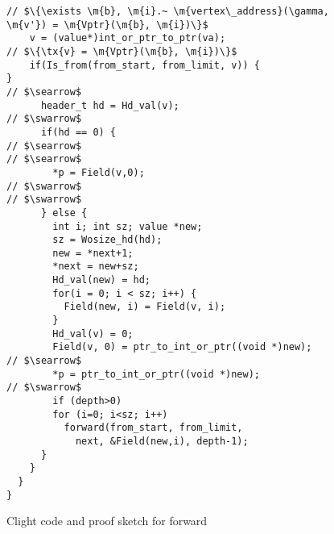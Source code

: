 \begin{figure}[t]
\begin{lstlisting}
// $\{\exists \m{b}, \m{i}.~ \m{vertex\_address}(\gamma, \m{v'}) = \m{Vptr}(\m{b}, \m{i})\}$
    v = (value*)int_or_ptr_to_ptr(va);
// $\{\tx{v} = \m{Vptr}(\m{b}, \m{i})\}$
    if(Is_from(from_start, from_limit, v)) {
}
// $\searrow$
      header_t hd = Hd_val(v);
// $\swarrow$
      if(hd == 0) {
// $\searrow$
// $\searrow$
        *p = Field(v,0);
// $\swarrow$
// $\swarrow$
      } else {
        int i; int sz; value *new;
        sz = Wosize_hd(hd);
        new = *next+1;
        *next = new+sz;
        Hd_val(new) = hd;
        for(i = 0; i < sz; i++) {
          Field(new, i) = Field(v, i);
        }
        Hd_val(v) = 0;
        Field(v, 0) = ptr_to_int_or_ptr((void *)new);
// $\searrow$
        *p = ptr_to_int_or_ptr((void *)new);
// $\swarrow$
        if (depth>0)
        for (i=0; i<sz; i++)
          forward(from_start, from_limit, 
            next, &Field(new,i), depth-1);
      }
    }
  }
}
\end{lstlisting}

\vspace{-0.4em}
\caption{Clight code and proof sketch for forward}
\label{fig:forward}
\vspace{-1em}
\end{figure}